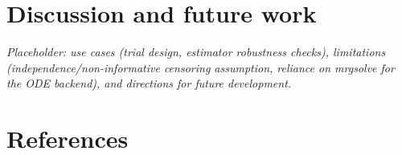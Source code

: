 \section{Discussion and future work}\label{discussion-and-future-work}

\emph{Placeholder: use cases (trial design, estimator robustness checks),
limitations (independence/non-informative censoring assumption, reliance
on mrgsolve for the ODE backend), and directions for future development.}

\section*{References}\label{references}



\address{%
Carlos Traynor\\
{[}affiliation to be confirmed{]}\\%
{[}address to be confirmed{]}\\
%
%
%
\href{mailto:carlos.traynor.qcp@gmail.com}{\nolinkurl{carlos.traynor.qcp@gmail.com}}%
}
